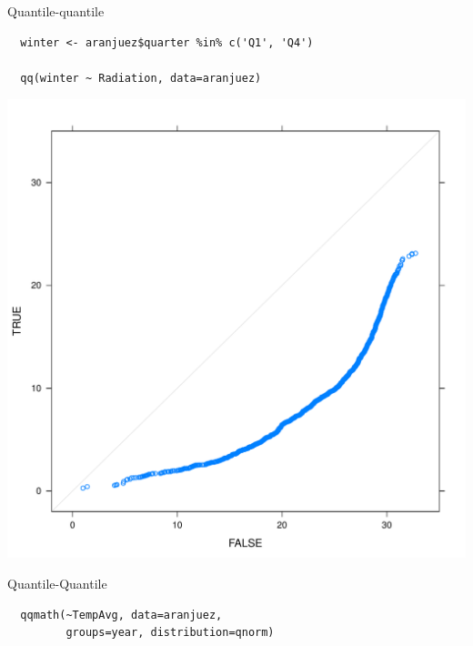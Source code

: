 \documentclass[xcolor={usenames,svgnames,dvipsnames}]{beamer}
\begin{document}
\begin{frame}[fragile,label=sec-2-1-52]{Quantile-quantile}
 \lstset{language=R,label= ,caption= ,numbers=none}
\begin{lstlisting}
  winter <- aranjuez$quarter %in% c('Q1', 'Q4')
  
  qq(winter ~ Radiation, data=aranjuez)
\end{lstlisting}
\end{frame}

\begin{frame}[label=sec-2-1-53]{}
\includegraphics[width=.9\linewidth]{figs/qqWinter.pdf}
\end{frame}

\begin{frame}[fragile,label=sec-2-1-54]{Quantile-Quantile}
 \lstset{language=R,label= ,caption= ,numbers=none}
\begin{lstlisting}
  qqmath(~TempAvg, data=aranjuez,
         groups=year, distribution=qnorm)
\end{lstlisting}
\end{frame}
\end{document}
